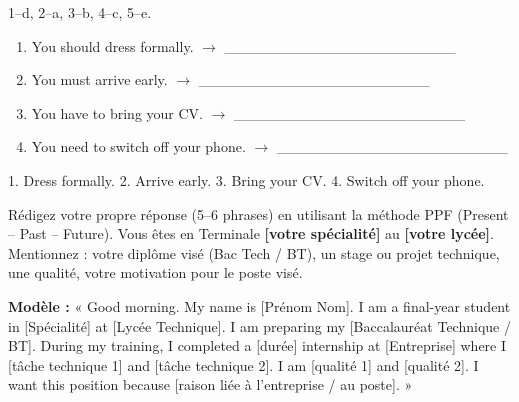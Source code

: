 \documentclass[11pt]{article}
\begin{document}
\begin{corrige}[Exercice 1]
1--d, 2--a, 3--b, 4--c, 5--e.
\end{corrige}

\begin{exercice}
\begin{enumerate}
    \item You should dress formally. $\rightarrow$ \_\_\_\_\_\_\_\_\_\_\_\_\_\_\_\_\_\_\_\_\_\_
    \item You must arrive early. $\rightarrow$ \_\_\_\_\_\_\_\_\_\_\_\_\_\_\_\_\_\_\_\_\_\_
    \item You have to bring your CV. $\rightarrow$ \_\_\_\_\_\_\_\_\_\_\_\_\_\_\_\_\_\_\_\_\_\_
    \item You need to switch off your phone. $\rightarrow$ \_\_\_\_\_\_\_\_\_\_\_\_\_\_\_\_\_\_\_\_\_\_
\end{enumerate}
\end{exercice}


\begin{corrige}[Exercice 2]
1. Dress formally. 2. Arrive early. 3. Bring your CV. 4. Switch off your phone.
\end{corrige}

\begin{exercice}
Rédigez votre propre réponse (5--6 phrases) en utilisant la méthode PPF (Present -- Past -- Future). Vous êtes en Terminale \textbf{[votre spécialité]} au \textbf{[votre lycée]}. Mentionnez : votre diplôme visé (Bac Tech / BT), un stage ou projet technique, une qualité, votre motivation pour le poste visé.
\end{exercice}


\begin{corrige}[Exercice 3]
\textbf{Modèle :} « Good morning. My name is [Prénom Nom]. I am a final-year student in [Spécialité] at [Lycée Technique]. I am preparing my [Baccalauréat Technique / BT]. During my training, I completed a [durée] internship at [Entreprise] where I [tâche technique 1] and [tâche technique 2]. I am [qualité 1] and [qualité 2]. I want this position because [raison liée à l'entreprise / au poste]. »
\end{corrige}
\end{document}
